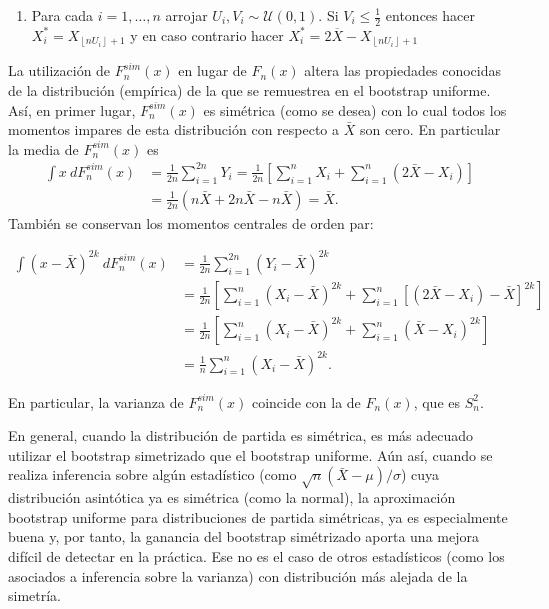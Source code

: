 \documentclass[
]{book}
\providecommand{\tightlist}{%
  \setlength{\itemsep}{0pt}\setlength{\parskip}{0pt}}
\theoremstyle{break}
\theoremstyle{definition}
\theoremstyle{definition}
\theoremstyle{definition}
\theoremstyle{definition}
\theoremstyle{remark}
\begin{document}
\begin{enumerate}
\def\labelenumi{\arabic{enumi}.}
\tightlist
\item
  Para cada \(i=1,\ldots ,n\) arrojar
  \(U_i,V_i\sim \mathcal{U}\left( 0,1 \right)\). Si \(V_i\leq \frac{1}{2}\)
  entonces hacer \(X_i^{\ast}=X_{\left\lfloor nU_i\right\rfloor +1}\) y en caso contrario hacer
  \(X_i^{\ast}=2\overline{X }-X_{\left\lfloor nU_i\right\rfloor +1}\)
\end{enumerate}

La utilización de \(F_n^{sim}\left( x \right)\) en lugar de \(F_n\left( x \right)\) altera las propiedades conocidas de la distribución
(empírica) de la que se remuestrea en el bootstrap uniforme. Así, en
primer lugar, \(F_n^{sim}\left( x \right)\) es simétrica (como se desea)
con lo cual todos los momentos impares de esta distribución con respecto
a \(\bar{X}\) son cero.
En particular la media de \(F_n^{sim}\left(x \right)\) es
\[\begin{aligned}
\int x~dF_n^{sim}\left( x \right) &= \frac{1}{2n}\sum_{i=1}^{2n}Y_i=\frac{
1}{2n}\left[ \sum_{i=1}^{n}X_i+\sum_{i=1}^{n}\left( 2\bar{X}
-X_i \right) \right] \\
&= \frac{1}{2n}\left( n\bar{X}+2n\bar{X}-n\bar{X} \right) =
\bar{X}.\end{aligned}\]
También se conservan los momentos centrales de orden par:

\[\begin{aligned}
\int \left( x-\bar{X} \right)^{2k}~dF_n^{sim}\left( x \right) &= \frac{
1}{2n}\sum_{i=1}^{2n}\left( Y_i-\bar{X} \right)^{2k} \\
&= \frac{1}{2n}\left[ \sum_{i=1}^{n}\left( X_i-\bar{X} \right)
^{2k}+\sum_{i=1}^{n}\left[ \left( 2\bar{X}-X_i \right) -\bar{X}
\right]^{2k}\right] \\
&= \frac{1}{2n}\left[ \sum_{i=1}^{n}\left( X_i-\bar{X} \right)
^{2k}+\sum_{i=1}^{n}\left( \bar{X}-X_i \right)^{2k}\right] \\
&= \frac{1}{n}\sum_{i=1}^{n}\left( X_i-\bar{X} \right)^{2k}.
\end{aligned}\]

En particular, la varianza de \(F_n^{sim}\left( x \right)\) coincide con
la de \(F_n\left( x \right)\), que es \(S_n^2\).

En general, cuando la distribución de partida es simétrica, es más
adecuado utilizar el bootstrap simetrizado que el bootstrap uniforme.
Aún así, cuando se realiza inferencia sobre algún estadístico (como
\(\sqrt{n}(\bar{X}-\mu)/\sigma\)) cuya distribución
asintótica ya es simétrica (como la normal), la aproximación bootstrap
uniforme para distribuciones de partida simétricas, ya es especialmente
buena y, por tanto, la ganancia del bootstrap simétrizado aporta una
mejora difícil de detectar en la práctica. Ese no es el caso de otros
estadísticos (como los asociados a inferencia sobre la varianza) con
distribución más alejada de la simetría.
\end{document}

